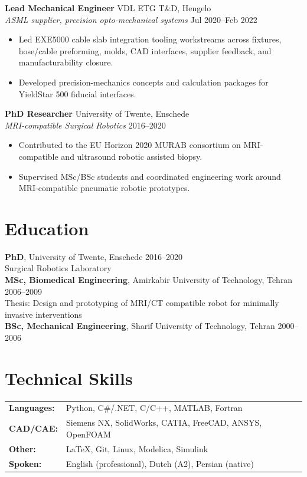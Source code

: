 \documentclass[10pt,a4paper]{article}
\begin{document}
\vspace{4pt}
\textbf{Lead Mechanical Engineer} \hfill VDL ETG T\&D, Hengelo \\
{\small\textit{ASML supplier, precision opto-mechanical systems}} \hfill {\small Jul 2020--Feb 2022}
\begin{itemize}
 \item Led EXE5000 cable slab integration tooling workstreams across fixtures, hose/cable preforming, molds, CAD interfaces, supplier feedback, and manufacturability closure.
 \item Developed precision-mechanics concepts and calculation packages for YieldStar 500 fiducial interfaces.
\end{itemize}

\vspace{4pt}
\textbf{PhD Researcher} \hfill University of Twente, Enschede \\
{\small\textit{MRI-compatible Surgical Robotics}} \hfill {\small 2016--2020}
\begin{itemize}
 \item Contributed to the EU Horizon 2020 MURAB consortium on MRI-compatible and ultrasound robotic assisted biopsy.
 \item Supervised MSc/BSc students and coordinated engineering work around MRI-compatible pneumatic robotic prototypes.
\end{itemize}

\section{Education}

\textbf{PhD}, University of Twente, Enschede \hfill 2016--2020 \\
{\small Surgical Robotics Laboratory } \\[2pt]
\textbf{MSc, Biomedical Engineering}, Amirkabir University of Technology, Tehran \hfill 2006--2009 \\
{\small Thesis: Design and prototyping of MRI/CT compatible robot for minimally invasive interventions} \\[2pt]
\textbf{BSc, Mechanical Engineering}, Sharif University of Technology, Tehran \hfill 2000--2006

\section{Technical Skills}

{\small
\begin{tabularx}{\textwidth}{@{}lX@{}}
 \textbf{Languages:} & Python, C\#/.NET, C/C++, MATLAB, Fortran \\
 \textbf{CAD/CAE:}   & Siemens NX, SolidWorks, CATIA, FreeCAD, ANSYS, OpenFOAM \\
 \textbf{Other:}    & \LaTeX, Git, Linux, Modelica, Simulink \\
 \textbf{Spoken:}   & English (professional), Dutch (A2), Persian (native) \\
\end{tabularx}
}
\end{document}
